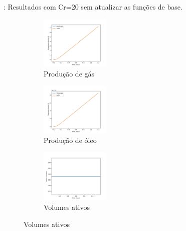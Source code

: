 \documentclass[professionalfont]{beamer}
\begin{document}
\begin{frame}{\FrameProblemName: {\small Resultados com Cr=20 sem atualizar as funções de base.}}
    \begin{figure}[!ht]
        \centering
        \begin{subfigure}{.48\textwidth}
            \centering
            \includegraphics[height=2.5cm]{./imgs/pr2/3k_5000x1x1/cr 20/v2/no_update/svgtopng/figura_case-finescale_3k_5000_CR20_no__updateGas_production.png}
            \caption{Produção de gás}
        \end{subfigure}
        \hfill
        \begin{subfigure}{.48\textwidth}
            \centering
            \includegraphics[height=2.5cm]{./imgs/pr2/3k_5000x1x1/cr 20/v2/no_update/svgtopng/figura_case-finescale_3k_5000_CR20_no__updateOil_production.png}
            \caption{Produção de óleo}
        \end{subfigure}
        \bigskip
        \begin{subfigure}{\textwidth}
            \centering
            \includegraphics[height=2.5cm]{./imgs/pr2/3k_5000x1x1/cr 20/v2/no_update/svgtopng/figura_case-finescale_3k_5000_CR20_no__updateActive_volumes.png}
            \caption{Volumes ativos}
        \end{subfigure}
        \label{fig:fig1_pr2-cr20}
        
    \end{figure}
\end{frame}
\end{document}
